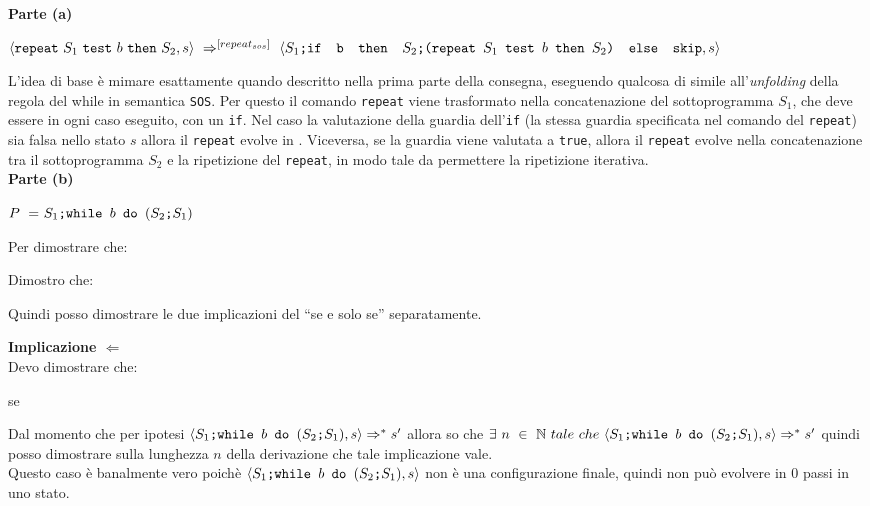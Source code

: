 {
	\hspace*{\textwidth-}

	\textbf{Parte (a)}
	\begin{center}
	$\langle{}\texttt{repeat}~S_1~\texttt{test}~b~\texttt{then}~S_2, s\rangle{}~\Rightarrow^{[repeat_{sos}]}~
	\langle{}\textrm{\normalfont{\texttt{$S_1$;\mbox{\normalfont{\texttt{if }}} b \textrm{\normalfont{\texttt{ then }}} \textrm{\normalfont{\texttt{$S_2$;(\texttt{repeat}~$S_1$~\texttt{test}~$b$~\texttt{then}~$S_2$)}}} \textrm{\normalfont{\texttt{ else }}} \textrm{\normalfont{\texttt{skip}}}}}}, s\rangle{}$
	\end{center}
	L'idea di base è mimare esattamente quando descritto nella prima parte
	della consegna, eseguendo qualcosa di simile all'\emph{unfolding} della
	regola del while in semantica \texttt{SOS}. Per questo il comando
	\texttt{repeat} viene trasformato nella concatenazione del sottoprogramma
	$S_1$, che deve essere in ogni caso eseguito, con un \texttt{if}. Nel caso
	la valutazione della guardia dell'\texttt{if} (la stessa guardia
	specificata nel comando del \texttt{repeat}) sia falsa nello stato $s$
	allora il \texttt{repeat} evolve in \skipistr{}. Viceversa, se la guardia
	viene valutata a \texttt{true}, allora il \texttt{repeat} evolve nella
	concatenazione tra il sottoprogramma $S_2$ e la ripetizione del 
	\texttt{repeat}, in modo tale da permettere la ripetizione iterativa.\\

	\textbf{Parte (b)}
	\begin{center}
	$P~=~\PDef{}$
	\end{center}
	Per dimostrare che:
	\begin{center}
	\exThreeB{}
	\end{center}
	Dimostro che:
	\begin{center}
	\exThreeIff{}
	\end{center}
	Quindi posso dimostrare le due implicazioni del ``se e solo se''
	separatamente.


	\textbf{Implicazione $\Longleftarrow$}\\
	Devo dimostrare che:
	\begin{center}
	se \exThreeRtL{}
	\end{center}
	Dal momento che per ipotesi $\confSs{\PDef{}}{s}\Rar{*}s'$ allora so che
	$\exists{}~n~\in~\mathbb{N}~tale~che~\confSs{\PDef{}}{s}\Rar{*}s'$ quindi
	posso dimostrare sulla lunghezza $n$ della derivazione che tale
	implicazione vale.\\

	 Questo caso è banalmente vero poichè $\confSs{\PDef{}}{s}$
	non è una configurazione finale, quindi non può evolvere in 0 passi in uno
	stato.

}
